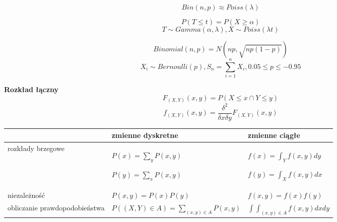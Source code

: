 \documentclass[a4paper]{article}
\begin{document}
    \begin{equation}
        Bin(n, p) \approx Poiss(\lambda)
    \end{equation}

    \begin{equation}
        P(T \leq t) = P( X \geq \alpha)
    \end{equation}
    \begin{equation*}
        T \sim Gamma(\alpha, \lambda), X \sim Poiss(\lambda t)
    \end{equation*}

    \begin{equation}
        Binomial(n, p) = N(np, \sqrt{np(1-p)})
    \end{equation}
    \begin{equation*}
        X_i \sim Bernoulli(p), S_n = \sum_{i=1}^{n} X_i, 0.05 \leq p \leq -0.95
    \end{equation*}


    \textbf{Rozkład łączny}
    \begin{equation*}
        F_{(X,Y)}(x,y) = P( X \leq x \cap Y \leq y)
    \end{equation*}
    \begin{equation*}
        f_{(X,Y)}(x,y) = \frac{\delta^2}{\delta x \delta y} F_{(X,Y)}(x,y)
    \end{equation*}

    \begin{table}[H]
        \begin{center}
            \begin{tabular}{ p{5cm} | p{5.5cm} p{5cm} }
                & zmienne dyskretne & zmienne ciągłe\\
                \toprule
                rozkłady brzegowe &
                $P(x) = \sum_y P(x,y)$

                $P(y) = \sum_x P(x,y)$

                &
                $f(x) = \int_{Y} f(x,y)dy$

                $f(y) = \int_{X} f(x,y)dx$
                \\

                niezależność &
                $P(x,y) = P(x)P(y)$ &
                $f(x,y) = f(x)f(y)$
                \\

                obliczanie prawdopodobieństwa &
                $P( (X,Y) \in A) = \sum_{(x,y) \in A} P(x,y)$ &
                $\int \int_{(x,y) \in A} f(x,y)dx dy$\\

                \bottomrule
            \end{tabular}
        \end{center}
    \end{table}
\end{document}
